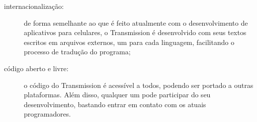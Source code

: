 
\begin{description}
    \item[internacionalização:] de forma semelhante ao que é feito atualmente com
        o desenvolvimento de aplicativos para celulares, o Transmission é desenvolvido
        com seus textos escritos em arquivos externos, um para cada linguagem,
        facilitando o processo de tradução do programa;

    \item[código aberto e livre:] o código do Transmission é acessível a todos, podendo
        ser portado a outras plataformas. Além disso, qualquer um pode participar do seu
        desenvolvimento, bastando entrar em contato com os atuais programadores.
\end{description}